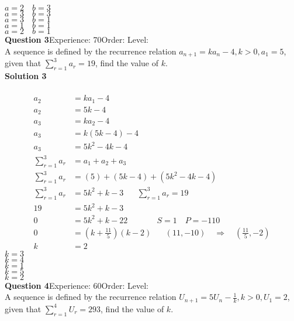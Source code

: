 \documentclass{article}
\begin{document}
$a=2\quad b=3$\\
$a=3\quad b=3$\\
$a=3\quad b=1$\\
$a=1\quad b=1$\\
$a=2\quad b=1$\\
\noindent\textbf{Question 3}\hspace{20pt}Experience: 70\hspace{20pt}Order: \hspace{20pt}Level: \\[2pt]
A sequence is defined by the recurrence relation $a_{n+1}=ka_n-4,k>0, a_1=5$, given that $\displaystyle\sum_{r=1}^{3} a_r=19$, find the value of $k$.\\[4pt]
\noindent\textbf{Solution 3}\\[2pt]
\\[-10pt]\begin{align*}
a_2&=ka_1-4\\[2pt]
a_2&=5k-4\\[12pt]
a_3&=ka_2-4\\[2pt]
a_3&=k(5k-4)-4\\[2pt]
a_3&=5k^2-4k-4\\[12pt]
\displaystyle\sum_{r=1}^{3} a_r&=a_1+a_2+a_3\\[2pt]
\displaystyle\sum_{r=1}^{3} a_r&=(5)+(5k-4)+(5k^2-4k-4)\\[2pt]
\displaystyle\sum_{r=1}^{3} a_r&=5k^2+k-3\hspace{20pt}\displaystyle\sum_{r=1}^{3} a_r=19\\[2pt]
19&=5k^2+k-3\\[2pt]
0&=5k^2+k-22\hspace{43pt}S=1 \quad P=-110\\[2pt]
0&=\left(k+\displaystyle\frac{11}{5}\right)(k-2)\hspace{20pt}(11,-10)\quad \Rightarrow \quad \left(\displaystyle\frac{11}{5},-2\right)\\[2pt]
k&=2
\end{align*}
$k=3$\\
$k=4$\\
$k=1$\\
$k=5$\\
$k=2$\\
\noindent\textbf{Question 4}\hspace{20pt}Experience: 60\hspace{20pt}Order: \hspace{20pt}Level: \\[2pt]
A sequence is defined by the recurrence relation $U_{n+1}=5U_n-\displaystyle\frac{1}{k},  k>0, U_1=2$, given that $\displaystyle\sum_{r=1}^{4} U_r=293$, find the value of $k$.\\[4pt]
\end{document}
